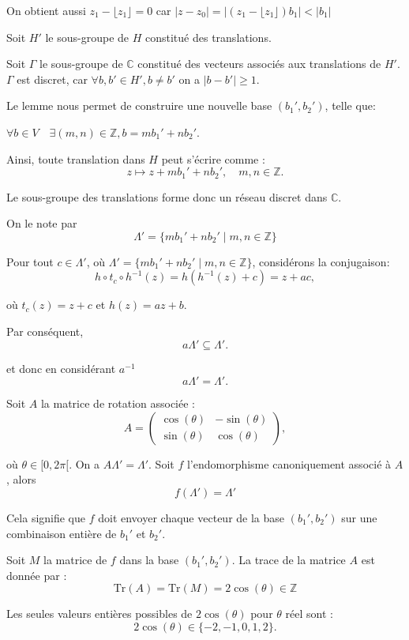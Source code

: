 On obtient aussi $z_1 - \lfloor z_1 \rfloor = 0$ car $|z - z_0 | = | (z_1 -
\lfloor z_1 \rfloor) b_1 | < |b_1 |$

Soit $H'$ le sous-groupe de $H$ constitu{\'e} des translations.

Soit $\Gamma$ le sous-groupe de $\mathbb{C}$ constitu{\'e} des vecteurs
associ{\'e}s aux translations de $H'$. $\Gamma$ est discret, car $\forall b,
b' \in H', b \neq b'$ on a $|b - b' | \geq 1$.

Le lemme nous permet de construire une nouvelle base $(b_1', b_2')$, telle
que:

$\forall b \in V \quad \exists (m, n) \in \mathbb{Z}, b = mb_1' + nb_2'$.

Ainsi, toute translation dans $H$ peut s'{\'e}crire comme :
\[ z \mapsto z + mb_1' + nb_2', \quad m, n \in \mathbb{Z}. \]


Le sous-groupe des translations forme donc un r{\'e}seau discret dans
$\mathbb{C}$.

On le note par
\[ \Lambda' =\{mb_1' + nb_2' \mid m, n \in \mathbb{Z}\} \]


Pour tout $c \in \Lambda'$, o{\`u} $\Lambda' =\{mb_1' + nb_2' \mid m, n \in
\mathbb{Z}\}$, consid{\'e}rons la conjugaison:
\[ h \circ t_c \circ h^{- 1} (z) = h (h^{- 1} (z) + c) = z + ac, \]


o{\`u} $t_c (z) = z + c$ et $h (z) = az + b$.

Par cons{\'e}quent,
\[ a \Lambda' \subseteq \Lambda' . \]


et donc en consid{\'e}rant $a^{- 1}$
\[ a \Lambda' = \Lambda' . \]


Soit $A$ la matrice de rotation associ{\'e}e :
\[ A = \left(\begin{array}{cc}
     \cos (\theta) & - \sin (\theta)\\
     \sin (\theta) & \cos (\theta)
   \end{array}\right), \]


o{\`u} $\theta \in [0, 2 \pi [$. On a $A \Lambda' = \Lambda'$. Soit $f$
l'endomorphisme canoniquement associ{\'e} {\`a} $A$, alors
\[ f (\Lambda') = \Lambda' \]


Cela signifie que $f$ doit envoyer chaque vecteur de la base $(b_1', b_2')$
sur une combinaison enti{\`e}re de $b_1'$ et $b_2'$.

Soit $M$ la matrice de $f$ dans la base $(b_1', b_2')$. La trace de la matrice
$A$ est donn{\'e}e par :
\[ \text{Tr} (A) = \text{Tr} (M) = 2 \cos (\theta) \in \mathbb{Z} \]


Les seules valeurs enti{\`e}res possibles de $2 \cos (\theta)$ pour $\theta$
r{\'e}el sont :
\[ 2 \cos (\theta) \in \{- 2, - 1, 0, 1, 2\}. \]


